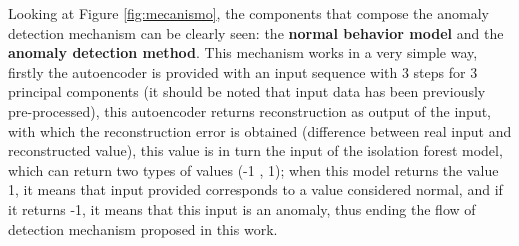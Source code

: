 Looking at Figure \ref{fig:mecanismo}, the components that compose the anomaly detection mechanism can be clearly seen: the \textbf{normal behavior model} and the \textbf{anomaly detection method}. This mechanism works in a very simple way, firstly the autoencoder is provided with an input sequence with 3 steps for 3 principal components (it should be noted that input data has been previously pre-processed), this autoencoder returns reconstruction as output of the input, with which the reconstruction error is obtained (difference between real input and reconstructed value), this value is in turn the input of the isolation forest model, which can return two types of values ​​(-1 , 1); when this model returns the value 1, it means that input provided corresponds to a value considered normal, and if it returns -1, it means that this input is an anomaly, thus ending the flow of detection mechanism proposed in this work.


 
